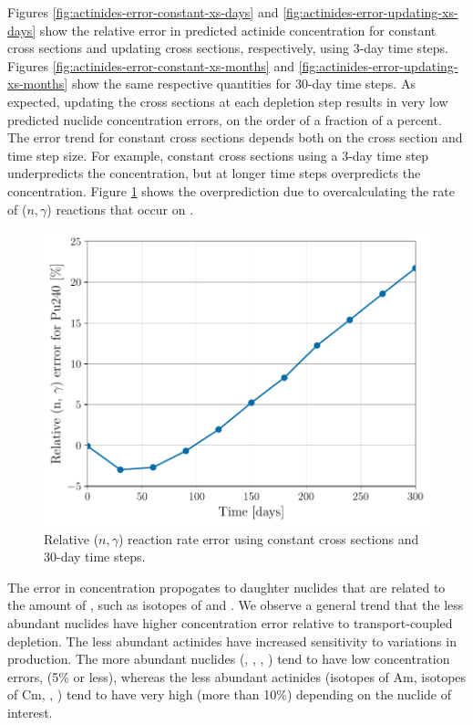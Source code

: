     Figures \ref{fig:actinides-error-constant-xs-days} and
    \ref{fig:actinides-error-updating-xs-days} show the relative error in
    predicted actinide concentration for constant cross sections and updating
    cross sections, respectively, using 3-day time steps. Figures
    \ref{fig:actinides-error-constant-xs-months} and
    \ref{fig:actinides-error-updating-xs-months} show the same respective
    quantities for 30-day time steps. As expected, updating the cross sections
    at each depletion step results in very low predicted nuclide concentration
    errors, on the order of a fraction of a percent. The error trend for
    constant cross sections depends both on the cross section and time step
    size. For example, constant cross sections using a 3-day time step
    underpredicts the  concentration, but at longer time steps
    overpredicts the concentration. Figure \ref{fig:pu240-n-gamma-months} shows
    the overprediction due to overcalculating the rate of ($n,\gamma$) reactions
    that occur on . 
    \begin{figure}[htpb]
        \centering
        \includegraphics[width=0.5\linewidth]{figs/pu240-n-gamma-months.pdf}
        \caption{Relative  ($n,\gamma$) reaction rate error using
        constant cross sections and 30-day time steps.}
        \label{fig:pu240-n-gamma-months}
    \end{figure}

    The error in  concentration propogates to daughter nuclides
    that are related to the amount of , such as isotopes of 
    and . We observe a general trend that the less abundant
    nuclides have higher concentration error relative to transport-coupled
    depletion. The less abundant actinides have increased sensitivity to
    variations in production. The more abundant nuclides (,
    , , ) tend to have low concentration
    errors, (5\% or less), whereas the less abundant actinides (isotopes of Am,
    isotopes of Cm, , ) tend to have very high (more
    than 10\%) depending on the nuclide of interest.


